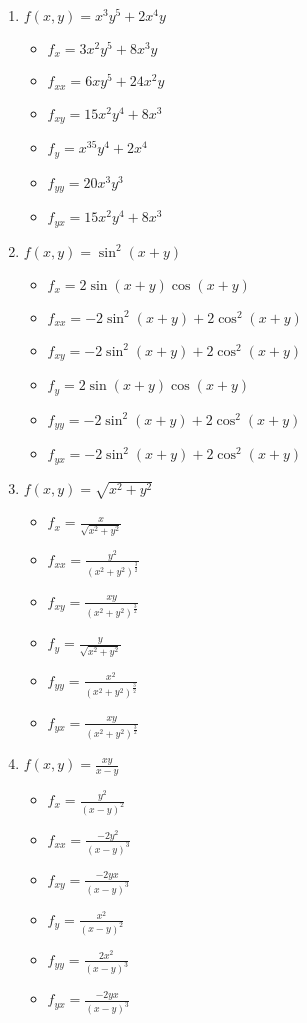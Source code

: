 \documentclass[../practica_04.tex]{subfiles}
\begin{document}
    \begin{enumerate}
        \item $f(x,y) = x^3y^5+2x^4y$
            \begin{itemize}
                \item $f_x = 3x^2y^5+8x^3y $
                \item $f_{xx} = 6xy^5 + 24x^2y $
                \item $f_{xy} = 15x^2y^4 + 8x^3 $
                \item $f_y = x^35y^4+2x^4 $
                \item $f_{yy} = 20x^3y^3 $
                \item $f_{yx} = 15x^2y^4 + 8x^3 $
            \end{itemize}
        \item $f(x,y) = \sin^2(x+y)$
            \begin{itemize}
                \item $f_x = 2\sin(x+y)\cos(x+y) $
                \item $f_{xx} = -2\sin^2(x+y) + 2\cos^2(x+y) $
                \item $f_{xy} = -2\sin^2(x+y) + 2\cos^2(x+y)$
                \item $f_y = 2\sin(x+y)\cos(x+y)$
                \item $f_{yy} = -2\sin^2(x+y) + 2\cos^2(x+y)$
                \item $f_{yx} = -2\sin^2(x+y) + 2\cos^2(x+y)$
            \end{itemize}
        \item $f(x,y) = \sqrt{x^2+y^2}$
            \begin{itemize}
                \item $f_x = \frac{x}{\sqrt{x^2+y^2}} $
                \item $f_{xx} = \frac{y^2}{(x^2+y^2)^{\frac{3}{2}}} $
                \item $f_{xy} = \frac{xy}{(x^2+y^2)^{\frac{3}{2}}}$
                \item $f_y = \frac{y}{\sqrt{x^2+y^2}}$
                \item $f_{yy} = \frac{x^2}{(x^2+y^2)^{\frac{3}{2}}}$
                \item $f_{yx} = \frac{xy}{(x^2+y^2)^{\frac{3}{2}}}$
            \end{itemize}
        \item $f(x,y) = \frac{xy}{x-y}$
            \begin{itemize}
                \item $f_x = \frac{y^2}{(x-y)^2} $
                \item $f_{xx} = \frac{-2y^2}{(x-y)^3}$
                \item $f_{xy} = \frac{-2yx}{(x-y)^3}$
                \item $f_y = \frac{x^2}{(x-y)^2}$
                \item $f_{yy} = \frac{2x^2}{(x-y)^3}$
                \item $f_{yx} = \frac{-2yx}{(x-y)^3}$
            \end{itemize}
    \end{enumerate}
\end{document}
